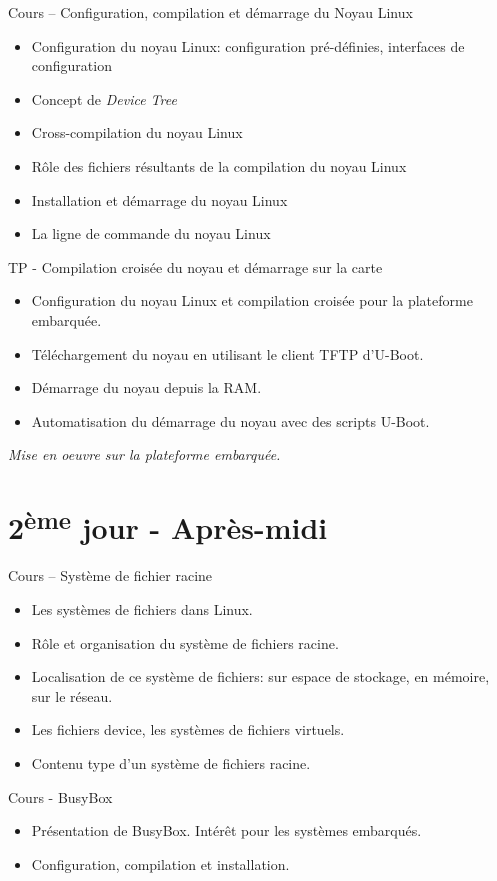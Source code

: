 \documentclass[a4paper,12pt,obeyspaces,spaces,hyphens]{article}
\begin{document}
\feagendatwocolumn
{Cours – Configuration, compilation et démarrage du Noyau Linux}
{
  \begin{itemize}
  \item Configuration du noyau Linux: configuration pré-définies,
    interfaces de configuration
  \item Concept de {\em Device Tree}
  \item Cross-compilation du noyau Linux
  \item Rôle des fichiers résultants de la compilation du noyau Linux
  \item Installation et démarrage du noyau Linux
  \item La ligne de commande du noyau Linux
  \end{itemize}
}
{TP - Compilation croisée du noyau et démarrage sur la carte}
{
  \begin{itemize}
  \item Configuration du noyau Linux et compilation croisée pour la
    plateforme embarquée.
  \item Téléchargement du noyau en utilisant le client TFTP d'U-Boot.
  \item Démarrage du noyau depuis la RAM.
  \item Automatisation du démarrage du noyau avec des scripts U-Boot.
  \end{itemize}

  \vspace{0.5cm}
  {\em Mise en oeuvre sur la plateforme embarquée.}
}

\section{2\textsuperscript{ème} jour - Après-midi}

\feagendatwocolumn
{Cours – Système de fichier racine}
{
  \begin{itemize}
  \item Les systèmes de fichiers dans Linux.
  \item Rôle et organisation du système de fichiers racine.
  \item Localisation de ce système de fichiers: sur espace
	de stockage, en mémoire, sur le réseau.
  \item Les fichiers device, les systèmes de fichiers virtuels.
  \item Contenu type d'un système de fichiers racine.
  \end{itemize}
}
{Cours - BusyBox}
{
  \begin{itemize}
  \item Présentation de BusyBox. Intérêt pour les systèmes embarqués.
  \item Configuration, compilation et installation.
  \end{itemize}
}
\end{document}
